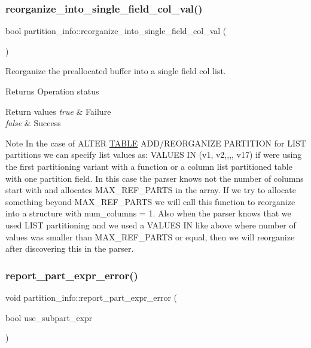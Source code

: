 \subsubsection{\texorpdfstring{reorganize\+\_\+into\+\_\+single\+\_\+field\+\_\+col\+\_\+val()}{reorganize\_into\_single\_field\_col\_val()}}
{\footnotesize\ttfamily bool partition\+\_\+info\+::reorganize\+\_\+into\+\_\+single\+\_\+field\+\_\+col\+\_\+val (\begin{DoxyParamCaption}{ }\end{DoxyParamCaption})}

Reorganize the preallocated buffer into a single field col list.

\begin{DoxyReturn}{Returns}
Operation status 
\end{DoxyReturn}

\begin{DoxyRetVals}{Return values}
{\em true} & Failure \\
\hline
{\em false} & Success\\
\hline
\end{DoxyRetVals}
\begin{DoxyNote}{Note}
In the case of A\+L\+T\+ER \mbox{\hyperlink{structTABLE}{T\+A\+B\+LE}} A\+D\+D/\+R\+E\+O\+R\+G\+A\+N\+I\+ZE P\+A\+R\+T\+I\+T\+I\+ON for L\+I\+ST partitions we can specify list values as\+: V\+A\+L\+U\+ES IN (v1, v2,,,, v17) if we\textquotesingle{}re using the first partitioning variant with a function or a column list partitioned table with one partition field. In this case the parser knows not the number of columns start with and allocates M\+A\+X\+\_\+\+R\+E\+F\+\_\+\+P\+A\+R\+TS in the array. If we try to allocate something beyond M\+A\+X\+\_\+\+R\+E\+F\+\_\+\+P\+A\+R\+TS we will call this function to reorganize into a structure with num\+\_\+columns = 1. Also when the parser knows that we used L\+I\+ST partitioning and we used a V\+A\+L\+U\+ES IN like above where number of values was smaller than M\+A\+X\+\_\+\+R\+E\+F\+\_\+\+P\+A\+R\+TS or equal, then we will reorganize after discovering this in the parser. 
\end{DoxyNote}
\mbox{\label{classpartition__info_a553fbd0c7a93c6ba8b57661101225a62}} 
\subsubsection{\texorpdfstring{report\+\_\+part\+\_\+expr\+\_\+error()}{report\_part\_expr\_error()}}
{\footnotesize\ttfamily void partition\+\_\+info\+::report\+\_\+part\+\_\+expr\+\_\+error (\begin{DoxyParamCaption}\item[{bool}]{use\+\_\+subpart\+\_\+expr }\end{DoxyParamCaption})}

